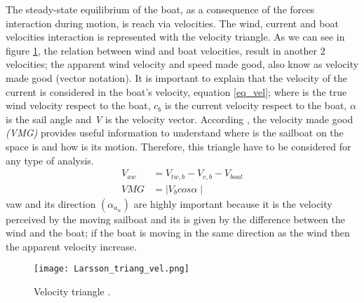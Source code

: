 The steady-state equilibrium of the boat, as a consequence of the forces interaction during motion,  is reach via velocities. The wind, current and boat velocities interaction is represented with the velocity triangle.  As we can see in figure \ref{vel_triangle}, the relation between wind and boat velocities, result in another 2 velocities; the apparent wind velocity  and speed made good,  also know as velocity made good (vector notation). It is important to explain that the velocity of the current is considered in the boat's velocity, equation \ref{eq_vel}; where  is the true wind velocity respect to the boat,  $c_b$ is the current velocity respect to the boat, $\alpha$ is the sail angle and \textit{V} is the velocity vector. According \cite{larsonprinciples}, the velocity made good \textit{(VMG)} provides useful information to understand where is the sailboat on the space is and how is its motion. Therefore, this triangle have to be considered for any type of analysis.
\begin{equation} [ht]
\label{eq_vel}
\begin{aligned}
V_{aw} & = V_{tw,b} - V_{c,b} - V_{boat} \\ 
VMG &=  \mid V_b cos \alpha  \mid 
\end{aligned}
\end {equation}
vaw and its direction $( \alpha_{a_w})$ are highly important because it is the velocity perceived by the moving sailboat and its is given by the difference between the wind and the boat; if the boat is moving in the same direction as the wind then the apparent velocity increase. 

\begin{figure}[ht]
\centering
  \texttt{[image: Larsson\_triang\_vel.png]}
 \caption{Velocity triangle  \cite{larsonprinciples}. }
\label{vel_triangle}
\end{figure}
 
